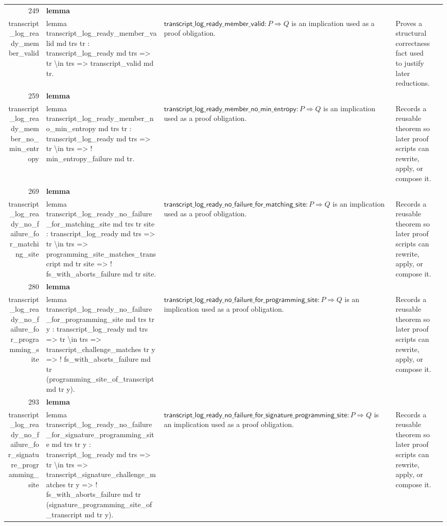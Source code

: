 \documentclass[10pt]{article}
\newcommand{\ec}[1]{\begingroup\ttfamily\scriptsize #1\endgroup}
\begin{document}
\begin{longtable}{r L{0.17\textwidth} L{0.26\textwidth} L{0.27\textwidth} L{0.20\textwidth}}
249 & \textbf{lemma}\\\ec{transcript\_log\_ready\_member\_valid} & \ec{lemma transcript\_log\_ready\_member\_valid md trs tr : transcript\_log\_ready md trs => tr \textbackslash{}in trs => transcript\_valid md tr.} & \(\mathsf{transcript\_log\_ready\_member\_valid} : P \Rightarrow Q\) is an implication used as a proof obligation. & Proves a structural correctness fact used to justify later reductions. \\
259 & \textbf{lemma}\\\ec{transcript\_log\_ready\_member\_no\_min\_entropy} & \ec{lemma transcript\_log\_ready\_member\_no\_min\_entropy md trs tr : transcript\_log\_ready md trs => tr \textbackslash{}in trs => ! min\_entropy\_failure md tr.} & \(\mathsf{transcript\_log\_ready\_member\_no\_min\_entropy} : P \Rightarrow Q\) is an implication used as a proof obligation. & Records a reusable theorem so later proof scripts can rewrite, apply, or compose it. \\
269 & \textbf{lemma}\\\ec{transcript\_log\_ready\_no\_failure\_for\_matching\_site} & \ec{lemma transcript\_log\_ready\_no\_failure\_for\_matching\_site md trs tr site : transcript\_log\_ready md trs => tr \textbackslash{}in trs => programming\_site\_matches\_transcript md tr site => ! fs\_with\_aborts\_failure md tr site.} & \(\mathsf{transcript\_log\_ready\_no\_failure\_for\_matching\_site} : P \Rightarrow Q\) is an implication used as a proof obligation. & Records a reusable theorem so later proof scripts can rewrite, apply, or compose it. \\
280 & \textbf{lemma}\\\ec{transcript\_log\_ready\_no\_failure\_for\_programming\_site} & \ec{lemma transcript\_log\_ready\_no\_failure\_for\_programming\_site md trs tr y : transcript\_log\_ready md trs => tr \textbackslash{}in trs => transcript\_challenge\_matches tr y => ! fs\_with\_aborts\_failure md tr (programming\_site\_of\_transcript md tr y).} & \(\mathsf{transcript\_log\_ready\_no\_failure\_for\_programming\_site} : P \Rightarrow Q\) is an implication used as a proof obligation. & Records a reusable theorem so later proof scripts can rewrite, apply, or compose it. \\
293 & \textbf{lemma}\\\ec{transcript\_log\_ready\_no\_failure\_for\_signature\_programming\_site} & \ec{lemma transcript\_log\_ready\_no\_failure\_for\_signature\_programming\_site md trs tr y : transcript\_log\_ready md trs => tr \textbackslash{}in trs => transcript\_signature\_challenge\_matches tr y => ! fs\_with\_aborts\_failure md tr (signature\_programming\_site\_of\_transcript md tr y).} & \(\mathsf{transcript\_log\_ready\_no\_failure\_for\_signature\_programming\_site} : P \Rightarrow Q\) is an implication used as a proof obligation. & Records a reusable theorem so later proof scripts can rewrite, apply, or compose it. \\

\end{longtable}
\end{document}
